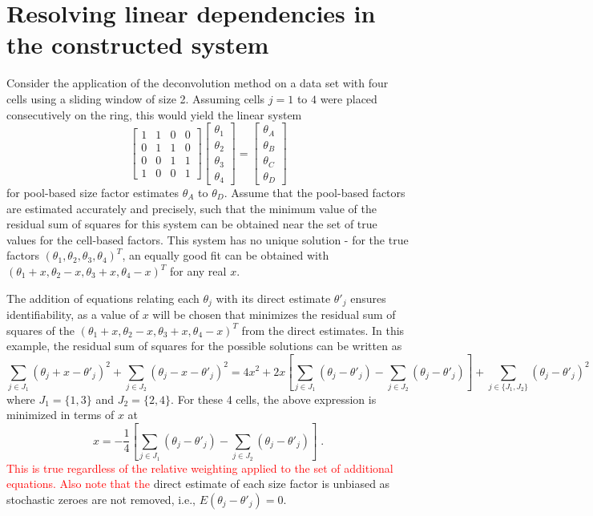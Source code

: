 \documentclass{article}
\newcommand\revised[1]{\textcolor{red}{#1}}
\begin{document}
\section{Resolving linear dependencies in the constructed system}
Consider the application of the deconvolution method on a data set with four cells using a sliding window of size 2.
Assuming cells $j=1$ to $4$ were placed consecutively on the ring, this would yield the linear system
\[
\begin{bmatrix}
1 & 1 & 0 & 0 \\
0 & 1 & 1 & 0 \\
0 & 0 & 1 & 1 \\
1 & 0 & 0 & 1 
\end{bmatrix}
\begin{bmatrix}
\theta_1 \\
\theta_2 \\
\theta_3 \\
\theta_4 
\end{bmatrix}
=
\begin{bmatrix}
\theta_A \\
\theta_B \\
\theta_C \\
\theta_D 
\end{bmatrix}
\]
for pool-based size factor estimates $\theta_A$ to $\theta_D$. 
Assume that the pool-based factors are estimated accurately and precisely, such that the minimum value of the residual sum of squares for this system can be obtained near the set of true values for the cell-based factors.
This system has no unique solution - for the true factors $(\theta_1, \theta_2, \theta_3, \theta_4)^T$, 
    an equally good fit can be obtained with $(\theta_1+x, \theta_2-x, \theta_3+x, \theta_4 - x)^T$ for any real $x$.

The addition of equations relating each $\theta_j$ with its direct estimate $\theta'_j$ ensures identifiability, 
    as a value of $x$ will be chosen that minimizes the residual sum of squares of the $(\theta_1+x, \theta_2-x, \theta_3+x, \theta_4 - x)^T$ from the direct estimates.
In this example, the residual sum of squares for the possible solutions can be written as
\[
\sum_{j \in J_1} (\theta_j +x - \theta'_j)^2+ \sum_{j \in J_2} (\theta_j -x - \theta'_j)^2 
= 4 x^2 + 2x\left[ \sum_{j \in J_1} (\theta_j - \theta'_j) - \sum_{j \in J_2} (\theta_j - \theta'_j)\right] + \sum_{j \in \{J_1, J_2\}} (\theta_j - \theta'_j)^2
\]
where $J_1 = \{1, 3\}$ and $J_2=\{2, 4\}$.
For these 4 cells, the above expression is minimized in terms of $x$ at
\[
x = - \frac{1}{4}\left[ \sum_{j \in J_1} (\theta_j - \theta'_j) - \sum_{j \in J_2} (\theta_j - \theta'_j)\right] \;.
\]
\revised{This is true regardless of the relative weighting applied to the set of additional equations.
Also note that the} direct estimate of each size factor is unbiased as stochastic zeroes are not removed, i.e., $E(\theta_j - \theta'_j)=0$.
\end{document}
